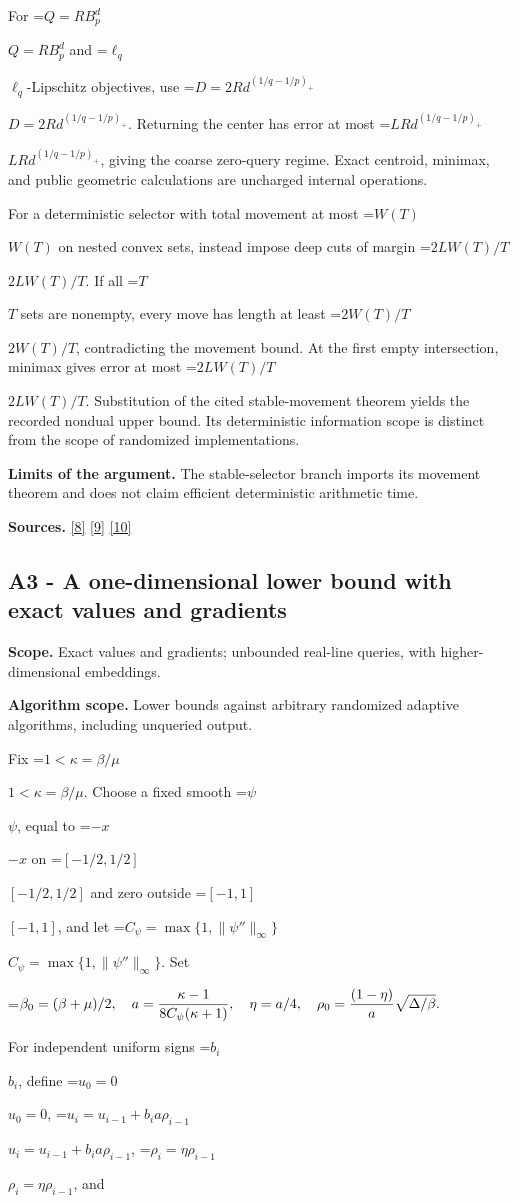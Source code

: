 \documentclass[10pt,a4paper]{article}
\newcommand{\AtlasMath}[1]{\par\begingroup\centering\setbox0=\hbox{$\displaystyle #1$}\ifdim\wd0>1.4\linewidth\typeout{ATLAS WIDE FORMULA: \the\wd0}\fi\ifdim\wd0>\linewidth\resizebox{\linewidth}{!}{\box0}\else\box0\fi\par\endgroup}
\newcommand{\AtlasInlineMath}[1]{\begingroup\setbox0=\hbox{$#1$}\ifdim\wd0>.4\linewidth\endgroup\AtlasMath{#1}\else\endgroup$#1$\fi}
\begin{document}
For \AtlasInlineMath{Q=RB_p^d} and \AtlasInlineMath{\ell_q}-Lipschitz objectives, use \AtlasInlineMath{D=2Rd^{(1/q-1/p)_+}}. Returning the center has error at most \AtlasInlineMath{LRd^{(1/q-1/p)_+}}, giving the coarse zero-query regime. Exact centroid, minimax, and public geometric calculations are uncharged internal operations.

For a deterministic selector with total movement at most \AtlasInlineMath{W(T)} on nested convex sets, instead impose deep cuts of margin \AtlasInlineMath{2LW(T)/T}. If all \AtlasInlineMath{T} sets are nonempty, every move has length at least \AtlasInlineMath{2W(T)/T}, contradicting the movement bound. At the first empty intersection, minimax gives error at most \AtlasInlineMath{2LW(T)/T}. Substitution of the cited stable-movement theorem yields the recorded nondual upper bound. Its deterministic information scope is distinct from the scope of randomized implementations.

\textbf{Limits of the argument.} The stable-selector branch imports its movement theorem and does not claim efficient deterministic arithmetic time.

\textbf{Sources.} \href{https://arxiv.org/pdf/1405.4980}{[8]} \href{https://www2.isye.gatech.edu/~nemirovs/MOR_AccuracyCertificates.pdf}{[9]} \href{https://arxiv.org/pdf/2609.20701}{[10]}

\subsection{A3 - A one-dimensional lower bound with exact values and gradients}
\textbf{Scope.} Exact values and gradients; unbounded real-line queries, with higher-dimensional embeddings.

\textbf{Algorithm scope.} Lower bounds against arbitrary randomized adaptive algorithms, including unqueried output.

Fix \AtlasInlineMath{1<\kappa=\beta/\mu}. Choose a fixed smooth \AtlasInlineMath{\psi}, equal to \AtlasInlineMath{-x} on \AtlasInlineMath{[-1/2,1/2]} and zero outside \AtlasInlineMath{[-1,1]}, and let \AtlasInlineMath{C_\psi=\max\{1,\|\psi''\|_\infty\}}. Set

\AtlasMath{\beta_0=(\beta+\mu)/2,\quad a={\kappa-1\over8C_\psi(\kappa+1)},\quad
\eta=a/4,\quad \rho_0={(1-\eta)\over a}\sqrt{\Delta/\beta}.}

For independent uniform signs \AtlasInlineMath{b_i}, define \AtlasInlineMath{u_0=0},
\AtlasInlineMath{u_i=u_{i-1}+b_i a\rho_{i-1}}, \AtlasInlineMath{\rho_i=\eta\rho_{i-1}}, and
\end{document}
